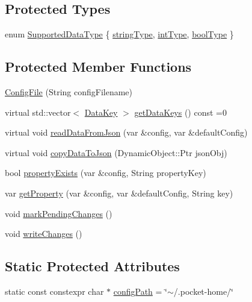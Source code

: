 \subsection*{Protected Types}
\begin{DoxyCompactItemize}
\item 
enum \mbox{\hyperlink{classConfigFile_aed5da60a5b6856a240c88d20c8975dce}{Supported\+Data\+Type}} \{ \mbox{\hyperlink{classConfigFile_aed5da60a5b6856a240c88d20c8975dcea8988515f68d6a7d2cda728890405c8bc}{string\+Type}}, 
\mbox{\hyperlink{classConfigFile_aed5da60a5b6856a240c88d20c8975dcea3162db2e4d4bee4b907dabadf34bc3ce}{int\+Type}}, 
\mbox{\hyperlink{classConfigFile_aed5da60a5b6856a240c88d20c8975dceadedf59f626a60e53192ea42ef95dc918}{bool\+Type}}
 \}
\end{DoxyCompactItemize}
\subsection*{Protected Member Functions}
\begin{DoxyCompactItemize}
\item 
\mbox{\hyperlink{classConfigFile_a6a763d70b03214a2435ff38840d1db34}{Config\+File}} (String config\+Filename)
\item 
virtual std\+::vector$<$ \mbox{\hyperlink{structConfigFile_1_1DataKey}{Data\+Key}} $>$ \mbox{\hyperlink{classConfigFile_a68a698b58c68f5e3a4d9ba8a81a82688}{get\+Data\+Keys}} () const =0
\item 
virtual void \mbox{\hyperlink{classConfigFile_af8d94d456b78720f3e90b6d9df3dc77e}{read\+Data\+From\+Json}} (var \&config, var \&default\+Config)
\item 
virtual void \mbox{\hyperlink{classConfigFile_a89902824e2b6cbd394a10530637ad3d7}{copy\+Data\+To\+Json}} (Dynamic\+Object\+::\+Ptr json\+Obj)
\item 
bool \mbox{\hyperlink{classConfigFile_a2faff4383c2921ee7c67aef7c55f0540}{property\+Exists}} (var \&config, String property\+Key)
\item 
var \mbox{\hyperlink{classConfigFile_a7e1391339b37bed32c642f638a845499}{get\+Property}} (var \&config, var \&default\+Config, String key)
\item 
void \mbox{\hyperlink{classConfigFile_a4dc13463864c0b90aef8d6bc5699d674}{mark\+Pending\+Changes}} ()
\item 
void \mbox{\hyperlink{classConfigFile_a4d2215793e3e3ff8132285f2caa82168}{write\+Changes}} ()
\end{DoxyCompactItemize}
\subsection*{Static Protected Attributes}
\begin{DoxyCompactItemize}
\item 
static const constexpr char $\ast$ \mbox{\hyperlink{classConfigFile_ab0e244c7b281434d671c30e0f5278119}{config\+Path}} = \char`\"{}$\sim$/.pocket-\/home/\char`\"{}
\end{DoxyCompactItemize}


